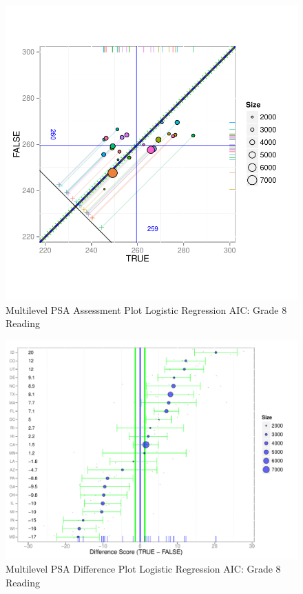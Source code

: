 \begin{figure}[h!]
\begin{center}
\includegraphics[width=\textwidth]{../Figures2009/g8read-mlpsa-lrAIC-circ.pdf}
\caption{Multilevel PSA Assessment Plot Logistic Regression AIC: Grade 8 Reading}
\end{center}
\end{figure}

\begin{figure}[h!]
\begin{center}
\includegraphics[width=\textwidth]{../Figures2009/g8read-mlpsa-lrAIC-diff.pdf}
\caption{Multilevel PSA Difference Plot Logistic Regression AIC: Grade 8 Reading}
\end{center}
\end{figure}

